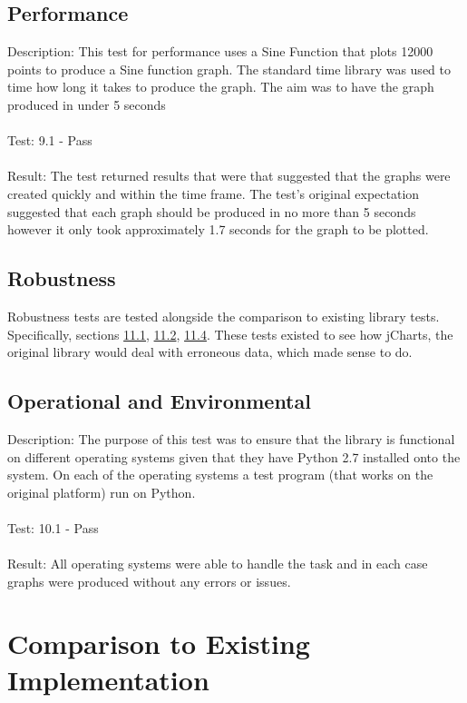 \documentclass[12pt, titlepage]{article}
\begin{document}
		
\subsection{Performance}

Description: This test for performance uses a Sine Function that plots 12000 points to produce a Sine function graph. The standard time library was used to time how long it takes to produce the graph. The aim was to have the graph produced in under 5 seconds\\\\
Test: 9.1 - Pass\\\\
Result: The test returned results that were that suggested that the graphs were created quickly and within the time frame. The test’s original expectation suggested that each graph should be produced in no more than 5 seconds however it only took approximately 1.7 seconds for the graph to be plotted.

\subsection{Robustness}
Robustness tests are tested alongside the comparison to existing library tests. Specifically, sections \hyperref[sec:11.1]{11.1}, \hyperref[sec:11.2]{11.2}, \hyperref[sec:11.4]{11.4}. These tests existed to see how jCharts, the original library would deal with erroneous data, which made sense to do. 

\subsection{Operational and Environmental}

Description: The purpose of this test was to ensure that the library is functional on different operating systems given that they have Python 2.7 installed onto the system. On each of the operating systems a test program (that works on the original platform) run on Python.\\\\
Test: 10.1 - Pass\\\\
Result: All operating systems were able to handle the task and in each case graphs were produced without any errors or issues.

		
\section{Comparison to Existing Implementation}	
\end{document}
